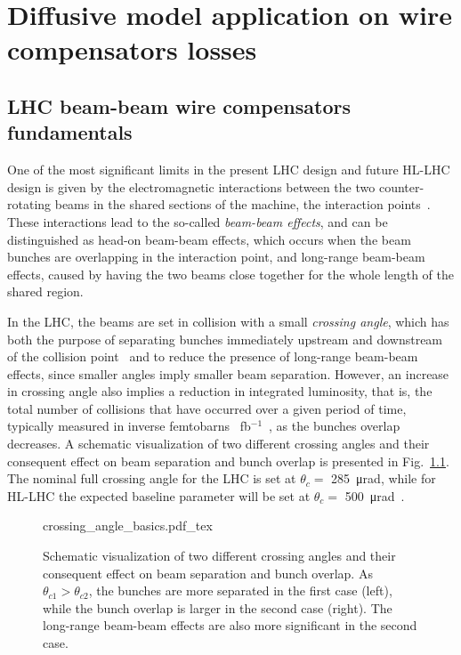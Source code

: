 \chapter{Diffusive model application on wire compensators losses}

\section{LHC beam-beam wire compensators fundamentals}

One of the most significant limits in the present LHC design and future HL-LHC design is given by the electromagnetic interactions between the two counter-rotating beams in the shared sections of the machine, the interaction points~\cite{Arduini_2016}. These interactions lead to the so-called \textit{beam-beam effects}, and can be distinguished as head-on beam-beam effects, which occurs when the beam bunches are overlapping in the interaction point, and long-range beam-beam effects, caused by having the two beams close together for the whole length of the shared region.

In the LHC, the beams are set in collision with a small \textit{crossing angle}, which has both the purpose of separating bunches immediately upstream and downstream of the collision point~\cite{Arduini_2016} and to reduce the presence of long-range beam-beam effects, since smaller angles imply smaller beam separation. However, an increase in crossing angle also implies a reduction in integrated luminosity, that is, the total number of collisions that have occurred over a given period of time, typically measured in inverse femtobarns \SI{}{fb}$^{-1}$~\cite{Herr:941318}, as the bunches overlap decreases. A schematic visualization of two different crossing angles and their consequent effect on beam separation and bunch overlap is presented in Fig.~\ref{fig:crossing-angles}. The nominal full crossing angle for the LHC is set at $\theta_c =$ \SI{285}{\micro\radian}, while for HL-LHC the expected baseline parameter will be set at $\theta_c =$ \SI{500}{\micro\radian}~\cite{BejarAlonso:2749422}. 

\begin{figure}[hpt]
    \centering
    \def\svgwidth{1.0\textwidth}
    {crossing_angle_basics.pdf_tex}
    \caption{Schematic visualization of two different crossing angles and their consequent effect on beam separation and bunch overlap. As $\theta_{c1} > \theta_{c2}$, the bunches are more separated in the first case (left), while the bunch overlap is larger in the second case (right). The long-range beam-beam effects are also more significant in the second case.}
    \label{fig:crossing-angles}
\end{figure}

